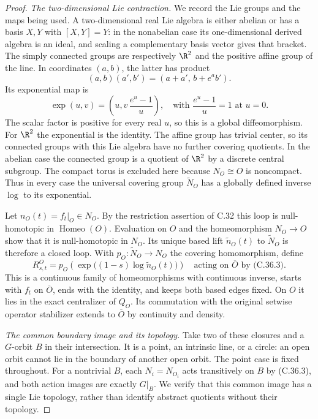 \begin{proof}
\emph{The two-dimensional Lie contraction.}
We record the Lie groups and the maps being used.
A two-dimensional real Lie algebra is either
abelian or has a basis $X,Y$ with $[X,Y]=Y$:
in the nonabelian case its one-dimensional
derived algebra is an ideal, and scaling a
complementary basis vector gives that bracket.
The simply connected groups are respectively
$\R^2$ and the positive affine group of the
line. In coordinates $(a,b)$, the latter has
product
\[
           (a,b)(a',b')=(a+a',\,b+e^a b').
                                                        \tag{C.36.4}
\]
Its exponential map is
\[
 \exp(u,v)=\left(u,v\,\frac{e^u-1}{u}\right),
 \quad\text{with }\frac{e^u-1}{u}=1\text{ at }u=0.
                                                        \tag{C.36.5}
\]
The scalar factor is positive for every real
$u$, so this is a global diffeomorphism.
For $\R^2$ the exponential is the identity.
The affine group has trivial center, so its
connected groups with this Lie algebra have
no further covering quotients. In the abelian
case the connected group is a quotient of
$\R^2$ by a discrete central subgroup.
The compact torus is excluded here because
$N_O\cong O$ is noncompact.
Thus in every case the universal covering
group $\widetilde N_O$ has a globally defined
inverse $\log$ to its exponential.

Let $n_O(t)=f_t|_O\in N_O$.
By the restriction assertion of C.32 this loop
is null-homotopic in $\operatorname{Homeo}(O)$.
Evaluation on $O$ and the homeomorphism
$N_O\to O$ show that it is null-homotopic
in $N_O$. Its unique based lift
$\widetilde n_O(t)$ to $\widetilde N_O$
is therefore a closed loop.
With $p_O:\widetilde N_O\to N_O$ the covering
homomorphism, define
\[
 R^O_{s,t}
   =p_O\!\left(\exp\bigl((1-s)\log\widetilde n_O(t)\bigr)\right)
       \quad\text{acting on }\overline O
       \text{ by (C.36.3)}.                             \tag{C.36.6}
\]
This is a continuous family of homeomorphisms
with continuous inverse, starts with $f_t$ on
$\overline O$, ends with the identity, and
keeps both based edges fixed.
On $O$ it lies in the exact centralizer of
$Q_O$. Its commutation with the original
setwise operator stabilizer extends to
$\overline O$ by continuity and density.

\emph{The common boundary image and its topology.}
Take two of these closures and a $G$-orbit
$B$ in their intersection. It is a point,
an intrinsic line, or a circle: an open orbit
cannot lie in the boundary of another open
orbit. The point case is fixed throughout.
For a nontrivial $B$, each $N_i=N_{O_i}$
acts transitively on $B$ by (C.36.3), and
both action images are exactly $G|_B$.
We verify that this common image has a single
Lie topology, rather than identify abstract
quotients without their topology.


\end{proof}

